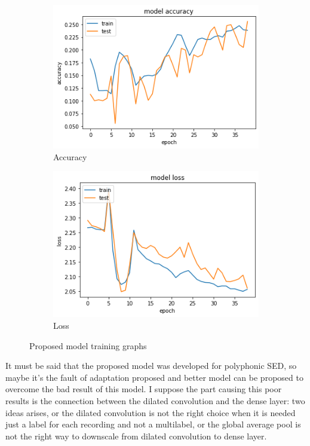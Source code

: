 \documentclass{article}
\begin{document}
\begin{figure}[H]
	\centering
	\begin{subfigure}{.5\textwidth}
		\centering
		\includegraphics[width=.95\linewidth]{./images/mono/new_model_acc.png}
		\caption{Accuracy}
	\end{subfigure}%
	\begin{subfigure}{.5\textwidth}
		\centering
		\includegraphics[width=.95\linewidth]{./images/mono/new_model_loss.png}
		\caption{Loss}
	\end{subfigure}
	\caption{Proposed model training graphs}
	\label{fig:mono_new_result}
\end{figure}

It must be said that the proposed model was developed for polyphonic SED, so maybe it's the fault of adaptation proposed and better model can be proposed to overcome the bad result of this model. I suppose the part causing this poor results is the connection between the dilated convolution and the dense layer: two ideas arises, or the dilated convolution is not the right choice when it is needed just a label for each recording and not a multilabel, or the global average pool is not the right way to downscale from dilated convolution to dense layer.
\end{document}
